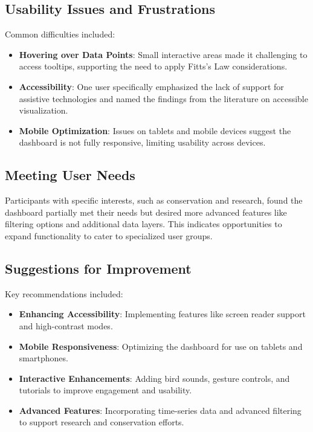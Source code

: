 \subsection{Usability Issues and Frustrations}

Common difficulties included:

\begin{itemize}
    \item \textbf{Hovering over Data Points}: Small interactive areas made it challenging to access tooltips, supporting the need to apply Fitts's Law considerations.
    \item \textbf{Accessibility}: One user specifically emphasized the lack of support for assistive technologies and named the findings from the literature on accessible visualization.
    \item \textbf{Mobile Optimization}: Issues on tablets and mobile devices suggest the dashboard is not fully responsive, limiting usability across devices.
\end{itemize}

\subsection{Meeting User Needs}

Participants with specific interests, such as conservation and research, found the dashboard partially met their needs but desired more advanced features like filtering options and additional data layers. This indicates opportunities to expand functionality to cater to specialized user groups.

\subsection{Suggestions for Improvement}

Key recommendations included:

\begin{itemize}
    \item \textbf{Enhancing Accessibility}: Implementing features like screen reader support and high-contrast modes.
    \item \textbf{Mobile Responsiveness}: Optimizing the dashboard for use on tablets and smartphones.
    \item \textbf{Interactive Enhancements}: Adding bird sounds, gesture controls, and tutorials to improve engagement and usability.
    \item \textbf{Advanced Features}: Incorporating time-series data and advanced filtering to support research and conservation efforts.
\end{itemize}